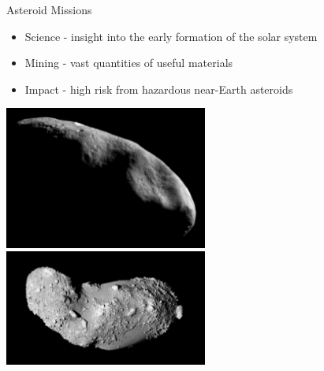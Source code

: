 \begin{frame}{Asteroid Missions}
\begin{itemize}
    \item Science - insight into the early formation of the solar system
    \item Mining - vast quantities of useful materials
    \item Impact - high risk from hazardous near-Earth asteroids
\end{itemize}    

\begin{center}
    \includegraphics[height=0.3\textheight,width=0.5\textwidth,keepaspectratio]{figures/2016AAS/near_mos_20001203_full.jpg}
    ~
    \includegraphics[height=0.3\textheight,width=0.5\textwidth,keepaspectratio]{figures/2016AAS/Itokawa8_hayabusa_1210.jpg}
\end{center}
\end{frame}

